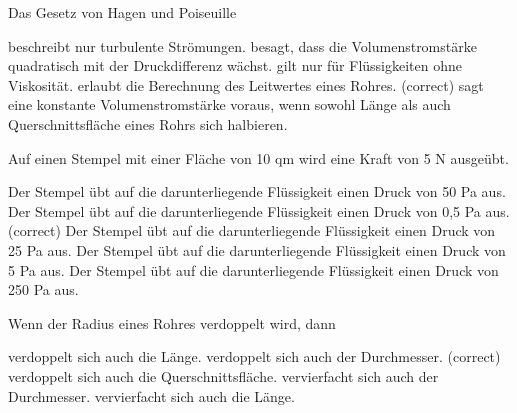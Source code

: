 \documentclass[11pt]{exam}
\begin{document}
\setlength{\voffset}{-0.5in}
\setlength{\headsep}{5pt}

\hspace{2mm}
 \hspace{5mm}
\vspace{4mm}

\begin{questions}

\question Das Gesetz von Hagen und Poiseuille

\begin{choices}
	\choice beschreibt nur turbulente Strömungen.
	\choice besagt, dass die Volumenstromstärke quadratisch mit der Druckdifferenz wächst.
	\choice gilt nur für Flüssigkeiten ohne Viskosität.
	\choice erlaubt die Berechnung des Leitwertes eines Rohres. (correct)
	\choice sagt eine konstante Volumenstromstärke voraus, wenn sowohl Länge als auch Querschnittsfläche eines Rohrs sich halbieren.
\end{choices}

\vspace{3mm}\question Auf einen Stempel mit einer Fläche von 10 qm wird eine Kraft von 5 N ausgeübt.

\begin{choices}
	\choice Der Stempel übt auf die darunterliegende Flüssigkeit einen Druck von 50 Pa aus.
	\choice Der Stempel übt auf die darunterliegende Flüssigkeit einen Druck von 0,5 Pa aus. (correct)
	\choice Der Stempel übt auf die darunterliegende Flüssigkeit einen Druck von 25 Pa aus.
	\choice Der Stempel übt auf die darunterliegende Flüssigkeit einen Druck von 5 Pa aus.
	\choice Der Stempel übt auf die darunterliegende Flüssigkeit einen Druck von 250 Pa aus.
\end{choices}

\vspace{3mm}\question Wenn der Radius eines Rohres verdoppelt wird, dann

\begin{choices}
	\choice verdoppelt sich auch die Länge.
	\choice verdoppelt sich auch der Durchmesser. (correct)
	\choice verdoppelt sich auch die Querschnittsfläche.
	\choice vervierfacht sich auch der Durchmesser.
	\choice vervierfacht sich auch die Länge.
\end{choices}


\end{questions}
\end{document}
